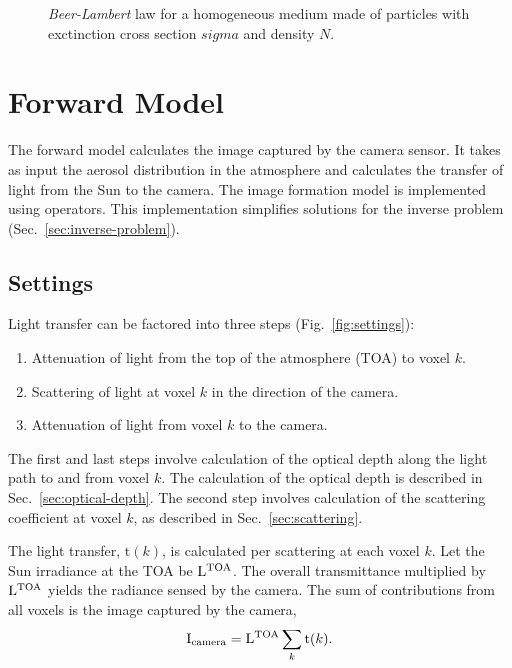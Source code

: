 \documentclass[10pt,twocolumn,letterpaper]{article}
\begin{document}
\begin{figure}
  \centering {}
  
  \caption{\emph{Beer-Lambert} law for a homogeneous medium made of
    particles with exctinction cross section $sigma$ and density $N$.}
  \label{fig:beer_lambert}
\end{figure}

\section{Forward Model}
\label{sec:forward-model}

The forward model calculates the image captured by the camera sensor.
It takes as input the aerosol distribution in the atmosphere and
calculates the transfer of light from the Sun to the camera.  The
image formation model is implemented using operators. This
implementation simplifies solutions for the inverse problem
(Sec.~\ref{sec:inverse-problem}).

\subsection{Settings}
\label{sec:settings}

Light transfer can be factored into three steps
(Fig.~\ref{fig:settings}):
\begin{enumerate}
\item Attenuation of light from the top of the atmosphere (TOA) to
  voxel $k$.
\item Scattering of light at voxel $k$ in the direction of the camera.
\item Attenuation of light from voxel $k$ to the camera.
\end{enumerate}
The first and last steps involve calculation of the optical depth
along the light path to and from voxel $k$. The calculation of the
optical depth is described in Sec.~\ref{sec:optical-depth}. The second
step involves calculation of the scattering coefficient at voxel $k$,
as described in Sec.~\ref{sec:scattering}.

The light transfer, $\mathrm{t}(k)$, is calculated per scattering at
each voxel $k$.  Let the Sun irradiance at the TOA be $\mathrm{L}^{\rm
  TOA}$.  The overall transmittance multiplied by $\mathrm{L}^{\rm
  TOA}$ yields the radiance sensed by the camera. The sum of
contributions from all voxels is the image captured by the camera,
\begin{align}
  \mathrm{I}_{\rm camera}=\mathrm{L}^{\rm TOA} \sum_k \mathrm{t}(k).
  \label{eq:transatsensor}
\end{align}
\end{document}

